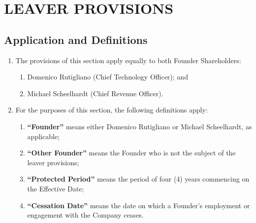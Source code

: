 \section{LEAVER PROVISIONS}

\subsection{Application and Definitions}
\begin{enumerate}[label=(\alph*)]
\item The provisions of this section apply equally to both Founder Shareholders:
    \begin{enumerate}[label=(\roman*)]
    \item Domenico Rutigliano (Chief Technology Officer); and
    \item Michael Scheelhardt (Chief Revenue Officer).
    \end{enumerate}
\item For the purposes of this section, the following definitions apply:
    \begin{enumerate}[label=(\roman*)]
    \item \textbf{``Founder''} means either Domenico Rutigliano or Michael Scheelhardt, as applicable;
    \item \textbf{``Other Founder''} means the Founder who is not the subject of the leaver provisions;
    \item \textbf{``Protected Period''} means the period of four (4) years commencing on the Effective Date;
    \item \textbf{``Cessation Date''} means the date on which a Founder's employment or engagement with the Company ceases.
    \end{enumerate}
\end{enumerate}

